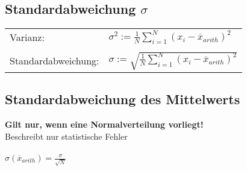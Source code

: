 		
		
	\subsection{Standardabweichung $\sigma$}	
		
	\begin{tabular}{ll}
	Varianz: & $\sigma^2 := \frac{1}{N} \sum \limits_{i = 1}^N (x_i - \overline{x}_{arith} )^2 $ \\
	\\
	Standardabweichung: &  $\sigma := \sqrt{ \frac{1}{N} \sum \limits_{i = 1}^N (x_i - \overline{x}_{arith} )^2 }$ \\
	\end{tabular}
		
		
		
	\subsection{Standardabweichung des Mittelwerts}	
	\textbf{Gilt nur, wenn eine Normalverteilung vorliegt!} \\
	Beschreibt nur statistische Fehler \\
	\\
	$\sigma(\overline{x}_{arith}) = \frac{\sigma}{\sqrt{N}} $
		
		
